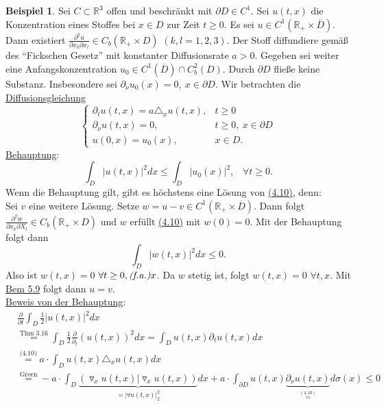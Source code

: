 \documentclass[a4paper]{scrreprt}
\newcommand{\R}{\mathbb{R}}
\newcommand{\jlabel}[1]{\label{j_#1}}
\newcommand{\jterm}[1]{\jlabel{#1}\uline{#1}}
\newcommand{\jshortlink}[1]{\jhyperref{#1}{\text{#1}}}
\newcommand{\jhyperref}[2]{\hyperref[j_#1]{#2}}
\newcommand{\jlink}[1]{\jhyperref{#1}{#1}}
\newcommand{\fa}{\text{\textit{(f.a.)}}}
\theoremstyle{plain}
\theoremstyle{definition}
\newtheorem{expl}[thm]{Beispiel}
\begin{document}
{{{{\begin{expl}
    \jlabel{Bsp 4.21}
    Sei $C\subset \R^3$ offen und beschränkt mit $\partial D\in C^1$. Sei $u(t,x)$ die Konzentration eines Stoffes bei $x\in D$ zur Zeit $t\ge 0$. Es sei $u\in C^1(\R_+ \times \overline{D})$. Dann existiert $\frac{\partial^2 u}{\partial x_k \partial x_l} \in C_b(\R_+\times D)$ $(k,l=1,2,3)$. Der Stoff diffundiere gemäß des ``Fickschen Gesetz'' mit konstanter Diffusionsrate $a>0$. Gegeben sei weiter eine Anfangskonzentration $u_0 \in C^1(\overline{D}) \cap C_b^2(D)$. Durch $\partial D$ fließe keine Substanz. Insbesondere sei $\partial_\nu u_0(x) = 0, \ x\in \partial D$. Wir betrachten die \jterm{Diffusionsgleichung}
    \begin{equation}
        \jlabel{(4.10)}
        \begin{cases}
            \partial_t u(t,x) = a\triangle_x u(t,x), &t\ge 0\\
            \partial_\nu u(t,x) = 0, &t\ge 0,\ x\in \partial D\\
            u(0,x) = u_0(x), &x\in D.
        \end{cases}
    \end{equation}
    \uline{Behauptung}:
    \[
        \int_D |u(t,x)|^2 dx \le \int_D |u_0(x)|^2, \hspace{10pt} \forall t\ge 0.
    \]
    Wenn die Behauptung gilt, gibt es höchstens eine Lösung von \jlink{(4.10)}, denn:\\
    Sei $v$ eine weitere Lösung. Setze $w=u-v \in C^1(\R_+\times \overline{D})$. Dann folgt $\frac{\partial^2 w}{\partial x_k \partial X_l} \in C_b(\R_+\times D)$ und $w$ erfüllt \jlink{(4.10)} mit $w(0) = 0$. Mit der Behauptung folgt dann
    \[
        \int_D |w(t,x)|^2 dx \le 0.
    \]
    Also ist $w(t,x)=0$ $\forall t\ge0, \fa x$. Da $w$ stetig ist, folgt $w(t,x)=0$ $\forall t,x$. Mit \jlink{Bem 5.9} folgt dann $u=v$.\\
    \uline{Beweis von der Behauptung}:
    \[
        \begin{split}
            &\frac{\partial}{\partial t} \int_D \frac{1}{2}|u(t,x)|^2 dx\\
            &\overset{\jshortlink{Thm 3.16}}{=} \int_D \frac{1}{2}\frac{\partial}{\partial_t} (u(t,x))^2 dx = \int_D u(t,x)\partial_t u(t,x) dx\\
            &\overset{\jshortlink{(4.10)}}{=} a\cdot \int_D u(t,x) \triangle_x u(t,x) dx\\
            &\overset{\jshortlink{Green}}{=} -a\cdot \int_D \underbrace{(\triangledown_x u(t,x)|\triangledown_x u(t,x))}_{=|\triangledown u(t,x)|_2^2}dx + a \cdot \int_{\partial D} u(t,x) \underbrace{\partial_\nu u(t,x)}_{\overset{\jlink{(4.10)}}{=}} d\sigma(x) \le 0
        \end{split}
    \]


\end{expl}}}}}
\end{document}
